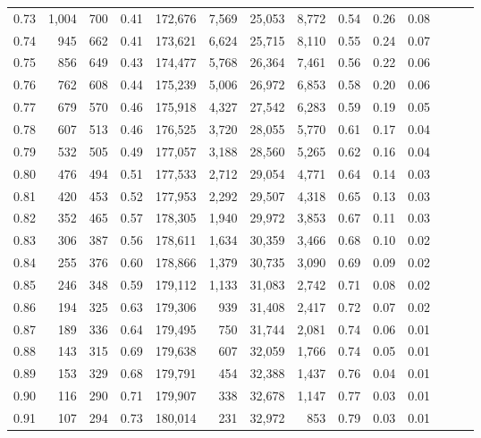 \begin{tabular}{rrrrrrrrrrrrrr}
0.73 &  1,004 &  700 &  0.41 &  172,676 &    7,569 &  25,053 &   8,772 &  0.54 &  0.26 &      0.08 \\
0.74 &    945 &  662 &  0.41 &  173,621 &    6,624 &  25,715 &   8,110 &  0.55 &  0.24 &      0.07 \\
0.75 &    856 &  649 &  0.43 &  174,477 &    5,768 &  26,364 &   7,461 &  0.56 &  0.22 &      0.06 \\
0.76 &    762 &  608 &  0.44 &  175,239 &    5,006 &  26,972 &   6,853 &  0.58 &  0.20 &      0.06 \\
0.77 &    679 &  570 &  0.46 &  175,918 &    4,327 &  27,542 &   6,283 &  0.59 &  0.19 &      0.05 \\
0.78 &    607 &  513 &  0.46 &  176,525 &    3,720 &  28,055 &   5,770 &  0.61 &  0.17 &      0.04 \\
0.79 &    532 &  505 &  0.49 &  177,057 &    3,188 &  28,560 &   5,265 &  0.62 &  0.16 &      0.04 \\
0.80 &    476 &  494 &  0.51 &  177,533 &    2,712 &  29,054 &   4,771 &  0.64 &  0.14 &      0.03 \\
0.81 &    420 &  453 &  0.52 &  177,953 &    2,292 &  29,507 &   4,318 &  0.65 &  0.13 &      0.03 \\
0.82 &    352 &  465 &  0.57 &  178,305 &    1,940 &  29,972 &   3,853 &  0.67 &  0.11 &      0.03 \\
0.83 &    306 &  387 &  0.56 &  178,611 &    1,634 &  30,359 &   3,466 &  0.68 &  0.10 &      0.02 \\
0.84 &    255 &  376 &  0.60 &  178,866 &    1,379 &  30,735 &   3,090 &  0.69 &  0.09 &      0.02 \\
0.85 &    246 &  348 &  0.59 &  179,112 &    1,133 &  31,083 &   2,742 &  0.71 &  0.08 &      0.02 \\
0.86 &    194 &  325 &  0.63 &  179,306 &      939 &  31,408 &   2,417 &  0.72 &  0.07 &      0.02 \\
0.87 &    189 &  336 &  0.64 &  179,495 &      750 &  31,744 &   2,081 &  0.74 &  0.06 &      0.01 \\
0.88 &    143 &  315 &  0.69 &  179,638 &      607 &  32,059 &   1,766 &  0.74 &  0.05 &      0.01 \\
0.89 &    153 &  329 &  0.68 &  179,791 &      454 &  32,388 &   1,437 &  0.76 &  0.04 &      0.01 \\
0.90 &    116 &  290 &  0.71 &  179,907 &      338 &  32,678 &   1,147 &  0.77 &  0.03 &      0.01 \\
0.91 &    107 &  294 &  0.73 &  180,014 &      231 &  32,972 &     853 &  0.79 &  0.03 &      0.01 \\

\end{tabular}

